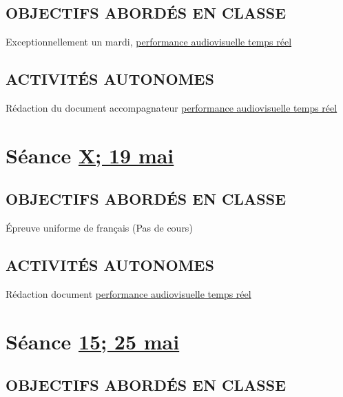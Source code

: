 \documentclass[
]{book}
\begin{document}
\hypertarget{objectifs-aborduxe9s-en-classe-15}{%
\subsection{OBJECTIFS ABORDÉS EN CLASSE}\label{objectifs-aborduxe9s-en-classe-15}}

Exceptionnellement un mardi,
\protect\hyperlink{sommatif_5}{performance audiovisuelle temps réel}

\hypertarget{activituxe9s-autonomes-15}{%
\subsection{ACTIVITÉS AUTONOMES}\label{activituxe9s-autonomes-15}}

Rédaction du document accompagnateur \protect\hyperlink{sommatif_5}{performance audiovisuelle temps réel}

\hypertarget{semaine_17}{%
\section{\texorpdfstring{Séance \protect\hyperlink{semaine_17}{X; 19 mai}}{Séance X; 19 mai}}\label{semaine_17}}

\hypertarget{objectifs-aborduxe9s-en-classe-16}{%
\subsection{OBJECTIFS ABORDÉS EN CLASSE}\label{objectifs-aborduxe9s-en-classe-16}}

Épreuve uniforme de français (Pas de cours)

\hypertarget{activituxe9s-autonomes-16}{%
\subsection{ACTIVITÉS AUTONOMES}\label{activituxe9s-autonomes-16}}

Rédaction document \protect\hyperlink{sommatif_5}{performance audiovisuelle temps réel}

\hypertarget{semaine_18}{%
\section{\texorpdfstring{Séance \protect\hyperlink{semaine_18}{15; 25 mai}}{Séance 15; 25 mai}}\label{semaine_18}}

\hypertarget{objectifs-aborduxe9s-en-classe-17}{%
\subsection{OBJECTIFS ABORDÉS EN CLASSE}\label{objectifs-aborduxe9s-en-classe-17}}
\end{document}
